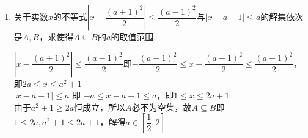\begin{enumerate}
\begin{enumerate}
\begin{jieda}
            第一个不等式的解集为$[-8, 2]$，第二个不等式的解集为$(-\infty, -6] \cup [1, +\infty) \cup \{-4\}$ \\
            因此第一个不等式成立第二个不等式不成立时$x \in (-6, -4) \cup (-4, 1)$，第二个不等式成立，第一个不等式不成立时$x \in (-\infty, -8) \cup (2, +\infty)$\\
            两者取并集，得到$(-\infty, -8) \cup (-6, -4) \cup (-4, 1) \cup (2, +\infty)$ 
        \end{jieda}
        \item 关于实数$x$的不等式$\left | x - \dfrac{(a+1)^2}{2} \right | \leq \dfrac{(a-1)^2}{2}$与$|x-a-1| \leq a$的解集依次是$A, B$，求使得$A \subseteq B$的$a$的取值范围.
        \begin{jieda}
            $\left | x - \dfrac{(a+1)^2}{2} \right | \leq \dfrac{(a-1)^2}{2}$即$-\dfrac{(a-1)^2}{2} \leq x - \dfrac{(a+1)^2}{2} \leq \dfrac{(a-1)^2}{2}$，即$2a \leq x \leq a^2+1$ \\
            $|x-a-1| \leq a$ 即 $-a \leq x-a-1 \leq a$，即$1 \leq x \leq 2a+1$ \\
            由于$a^2+1 \geq 2a$恒成立，所以$A$必不为空集，故$A \subseteq B$即$1 \leq 2a, a^2+1 \leq 2a+1$，解得$a \in \left[\dfrac{1}{2}, 2\right]$

        
        
        
        
        
        

\end{jieda}
\end{enumerate}
\end{enumerate}
